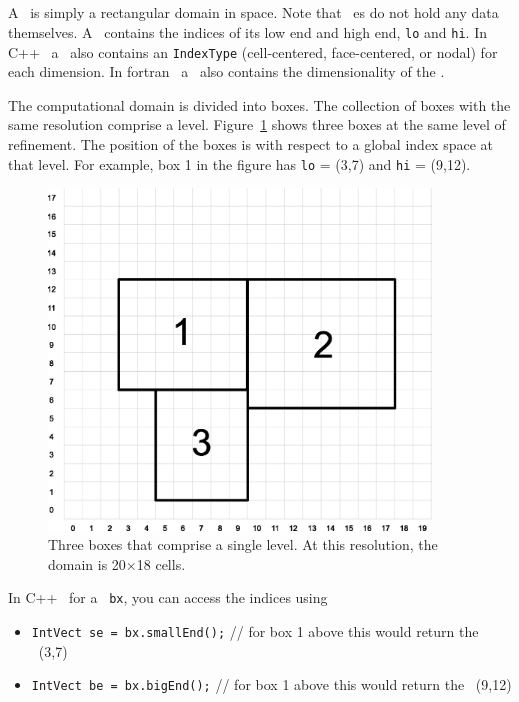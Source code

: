 \subsection{\BoxType}

A \BoxType\ is simply a rectangular domain in space.  Note that \BoxType~es
do not hold any data themselves. A \BoxType\ contains
the indices of its low end and high end, {\tt lo} and {\tt hi}.
In C++ \BoxLib\, a \BoxType\ also
contains an {\tt IndexType} (cell-centered, face-centered, or nodal) for each
dimension.  In fortran \BoxLib\, a \BoxType\ also contains the dimensionality
of the \BoxType.

The computational domain is divided into boxes.  The collection of
boxes with the same resolution comprise a level.
Figure~\ref{fig:boxes} shows three boxes at the same level of
refinement.  The position of the boxes is with respect to a global
index space at that level.  For example, box 1 in the figure has 
{\tt lo} = (3,7) and {\tt hi} = (9,12).
\begin{figure}[h]
\centering
\includegraphics[width=4.0in]{./Overview/index_grid2}
\caption{\label{fig:boxes} Three boxes that comprise a single level.
At this resolution, the domain is 20$\times$18 cells.}
\end{figure}

In C++ \BoxLib\, for a \BoxType\ {\tt bx},
you can access the indices using
\begin{itemize}
\item {{\tt IntVect se = bx.smallEnd();} // for box 1 above this would return
      the \IntVect\ (3,7)}
\item {{\tt IntVect be = bx.bigEnd();} // for box 1 above this would return 
      the \IntVect\ (9,12)}
\end{itemize}

